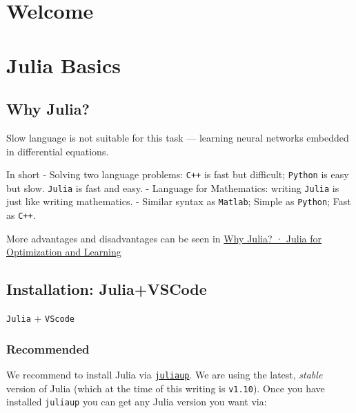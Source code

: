 \documentclass[
  letterpaper,
  DIV=11,
  numbers=noendperiod]{scrreport}
\author{Pengfei Song}
\date{2024-02-06}
\renewcommand*\contentsname{Table of contents}
\newcommand\contentsname{Table of contents}
\begin{document}
\renewcommand*\contentsname{Table of contents}
{
\hypersetup{linkcolor=}
\setcounter{tocdepth}{2}
\tableofcontents
}

\chapter*{Welcome}\label{welcome}



\chapter{Julia Basics}\label{julia-basics}

\section{Why Julia?}\label{why-julia}

Slow language is not suitable for this task --- learning neural networks
embedded in differential equations.

In short - Solving two language problems: \texttt{C++} is fast but
difficult; \texttt{Python} is easy but slow. \texttt{Julia} is fast and
easy. - Language for Mathematics: writing \texttt{Julia} is just like
writing mathematics. - Similar syntax as \texttt{Matlab}; Simple as
\texttt{Python}; Fast as \texttt{C++}.

More advantages and disadvantages can be seen in
\href{https://juliateachingctu.github.io/Julia-for-Optimization-and-Learning/stable/why/}{Why
Julia? · Julia for Optimization and Learning}

\section{Installation: Julia+VSCode}\label{installation-juliavscode}

\texttt{Julia} + \texttt{VScode}

\subsection{Recommended}\label{recommended}

We recommend to install Julia via
\href{https://github.com/JuliaLang/juliaup}{\texttt{juliaup}}. We are
using the latest, \emph{stable} version of Julia (which at the time of
this writing is \texttt{v1.10}). Once you have installed
\texttt{juliaup} you can get any Julia version you want via:
\end{document}
